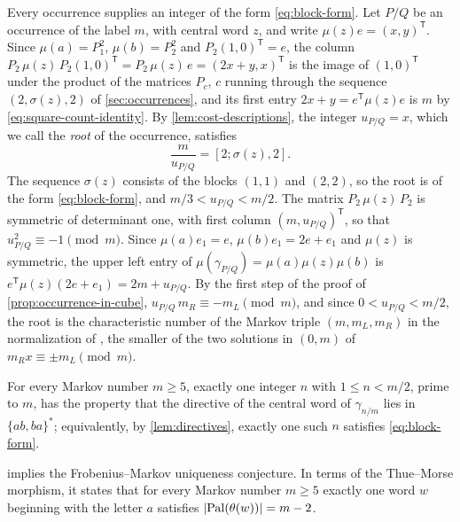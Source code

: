 Every occurrence supplies an integer of the form \eqref{eq:block-form}. Let
$P/Q$ be an occurrence of the label $m$, with central word $z$, and write
$\mu(z)e=(x,y)^{\mathsf T}$. Since $\mu(a)=P_1^2$, $\mu(b)=P_2^2$ and
$P_2(1,0)^{\mathsf T}=e$, the column
$P_2\,\mu(z)\,P_2(1,0)^{\mathsf T}=P_2\,\mu(z)\,e=(2x+y,x)^{\mathsf T}$ is the image
of $(1,0)^{\mathsf T}$ under the product of the matrices $P_c$, $c$ running
through the sequence $(2,\sigma(z),2)$ of \cref{sec:occurrences}, and its
first entry $2x+y=e^{\mathsf T}\mu(z)e$ is $m$ by \eqref{eq:square-count-identity}.
By \cref{lem:cost-descriptions}, the integer $u_{P/Q}=x$, which we call the
\emph{root} of the occurrence, satisfies
\begin{equation}\label{eq:root-cf}
 \frac m{u_{P/Q}}=[2;\sigma(z),2].
\end{equation}
The sequence $\sigma(z)$ consists of the blocks $(1,1)$ and $(2,2)$, so the
root is of the form \eqref{eq:block-form}, and $m/3<u_{P/Q}<m/2$. The matrix
$P_2\,\mu(z)\,P_2$ is symmetric of determinant one, with first column
$(m,u_{P/Q})^{\mathsf T}$, so that $u_{P/Q}^2\equiv-1\pmod m$. Since $\mu(a)e_1=e$,
$\mu(b)e_1=2e+e_1$ and $\mu(z)$ is symmetric, the upper left entry of
$\mu(\gamma_{P/Q})=\mu(a)\mu(z)\mu(b)$ is
$e^{\mathsf T}\mu(z)(2e+e_1)=2m+u_{P/Q}$. By the first step of the proof of
\cref{prop:occurrence-in-cube}, $u_{P/Q}\,m_R\equiv-m_L\pmod m$, and since
$0<u_{P/Q}<m/2$, the root is the characteristic number of the Markov triple
$(m,m_L,m_R)$ in the normalization of \cite[Section~2.2]{Aigner2013}, the
smaller of the two solutions in $(0,m)$ of $m_Rx\equiv\pm m_L\pmod m$.

\begin{conjecture}\label{conj:directives}
For every Markov number $m\geqslant5$, exactly one integer $n$ with
$1\leqslant n<m/2$, prime to $m$, has the property that the directive of the
central word of $\gamma_{n/m}$ lies in $\{ab,ba\}^*$; equivalently, by
\cref{lem:directives}, exactly one such $n$ satisfies \eqref{eq:block-form}.
\end{conjecture}

\begin{proposition}\label{prop:directives-uniqueness}
 implies the Frobenius--Markov uniqueness conjecture.
In terms of the Thue--Morse morphism, it states that for every Markov number
$m\geqslant5$ exactly one word $w$ beginning with the letter $a$ satisfies
$\lvert\operatorname{Pal}(\theta(w))\rvert=m-2$.
\end{proposition}

